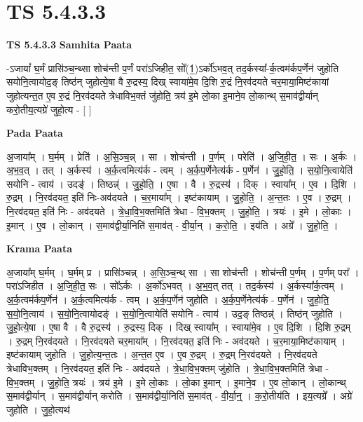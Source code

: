 \documentclass[17pt]{extarticle}
\begin{document}
\section{ TS 5.4.3.3 }

\textbf{TS 5.4.3.3 } \newline
\textbf{Samhita Paata} \newline

-ऽजायां᳚ घ॒र्मं प्रासि॑ञ्च॒न्थ्सा शोच॑न्ती प॒र्णं परा॑ऽजिहीत॒ सो᳚(1॒)ऽर्को॑ऽभव॒त् तद॒र्कस्या᳚-र्क॒त्वम॑र्कप॒र्णेन॑ जुहोति सयोनि॒त्वायोद॒ङ् तिष्ठ॑न् जुहोत्ये॒षा वै रु॒द्रस्य॒ दिख् स्वाया॑मे॒व दि॒शि रु॒द्रं नि॒रव॑दयते चर॒माया॒मिष्ट॑कायां जुहोत्यन्त॒त ए॒व रु॒द्रं नि॒रव॑दयते त्रेधाविभ॒क्तं जु॑होति॒ त्रय॑ इ॒मे लो॒का इ॒माने॒व लो॒कान्थ् स॒माव॑द्वीर्यान् करो॒तीय॒त्यग्रे॑ जुहो॒त्य - [  ] \newline

\textbf{Pada Paata} \newline

अ॒जाया᳚म् । घ॒र्मम् । प्रेति॑ । अ॒सि॒ञ्च॒न्न् । सा । शोच॑न्ती । प॒र्णम् । परेति॑ । अ॒जि॒ही॒त॒ । सः । अ॒र्कः । अ॒भ॒व॒त् । तत् । अ॒र्कस्य॑ । अ॒र्क॒त्वमित्य॑र्क - त्वम् । अ॒र्क॒प॒र्णेनेत्य॑र्क - प॒र्णेन॑ । जु॒हो॒ति॒ । स॒यो॒नि॒त्वायेति॑ सयोनि - त्वाय॑ । उदङ्॑ । तिष्ठन्न्॑ । जु॒हो॒ति॒ । ए॒षा । वै । रु॒द्रस्य॑ । दिक् । स्वाया᳚म् । ए॒व । दि॒शि । रु॒द्रम् । नि॒रव॑दयत॒ इति॑ निः-अव॑दयते । च॒र॒माया᳚म् । इष्ट॑कायाम् । जु॒हो॒ति॒ । अ॒न्त॒तः । ए॒व । रु॒द्रम् । नि॒रव॑दयत॒ इति॑ निः - अव॑दयते । त्रे॒धा॒वि॒भ॒क्तमिति॑ त्रेधा - वि॒भ॒क्तम् । जु॒हो॒ति॒ । त्रयः॑ । इ॒मे । लो॒काः । इ॒मान् । ए॒व । लो॒कान् । स॒माव॑द्वीर्या॒निति॑ स॒माव॑त् - वी॒र्या॒न् । क॒रो॒ति॒ । इय॑ति । अग्रे᳚ । जु॒हो॒ति॒ ।  \newline


\textbf{Krama Paata} \newline

अ॒जाया᳚म् घ॒र्मम् । घ॒र्मम् प्र । प्रासि॑ञ्चन्न् । अ॒सि॒ञ्च॒न्थ् सा । सा शोच॑न्ती । शोच॑न्ती प॒र्णम् । प॒र्णम् परा᳚ । परा॑ऽजिहीत । अ॒जि॒ही॒त॒ सः । सो᳚ऽर्कः । अ॒र्को॑ऽभवत् । अ॒भ॒व॒त् तत् । तद॒र्कस्य॑ । अ॒र्कस्या᳚र्क॒त्वम् । अ॒र्क॒त्वम॑र्कप॒र्णेन॑ । अ॒र्क॒त्वमित्य॑र्क - त्वम् । अ॒र्क॒प॒र्णेन॑ जुहोति । अ॒र्क॒प॒र्णेनेत्य॑र्क - प॒र्णेन॑ । जु॒हो॒ति॒ स॒यो॒नि॒त्वाय॑ । स॒यो॒नि॒त्वायोदङ्॑ । स॒यो॒नि॒त्वायेति॑ सयोनि - त्वाय॑ । उद॒ङ् तिष्ठन्न्॑ । तिष्ठ॑न् जुहोति । जु॒हो॒त्ये॒षा । ए॒षा वै । वै रु॒द्रस्य॑ । रु॒द्रस्य॒ दिक् । दिख् स्वाया᳚म् । स्वाया॑मे॒व । ए॒व दि॒शि । दि॒शि रु॒द्रम् । रु॒द्रम् नि॒रव॑दयते । नि॒रव॑दयते चर॒माया᳚म् । नि॒रव॑दयत॒ इति॑ निः - अव॑दयते । च॒र॒माया॒मिष्ट॑कायाम् । इष्ट॑कायाम् जुहोति । जु॒हो॒त्य॒न्त॒तः । अ॒न्त॒त ए॒व । ए॒व रु॒द्रम् । रु॒द्रम् नि॒रव॑दयते । नि॒रव॑दयते त्रेधाविभ॒क्तम् । नि॒रव॑दयत॒ इति॑ निः - अव॑दयते । त्रे॒धा॒वि॒भ॒क्तम् जु॑होति । त्रे॒धा॒वि॒भ॒क्तमिति॑ त्रेधा - वि॒भ॒क्तम् । जु॒हो॒ति॒ त्रयः॑ । त्रय॑ इ॒मे । इ॒मे लो॒काः । लो॒का इ॒मान् । इ॒माने॒व । ए॒व लो॒कान् । लो॒कान्थ् स॒माव॑द्वीर्यान् । स॒माव॑द्वीर्यान् करोति । स॒माव॑द्वीर्या॒निति॑ स॒माव॑त् - वी॒र्या॒न्॒ । क॒रो॒तीय॑ति । इय॒त्यग्रे᳚ । अग्रे॑ जुहोति । जु॒हो॒त्यथ॑ \newline
\end{document}
